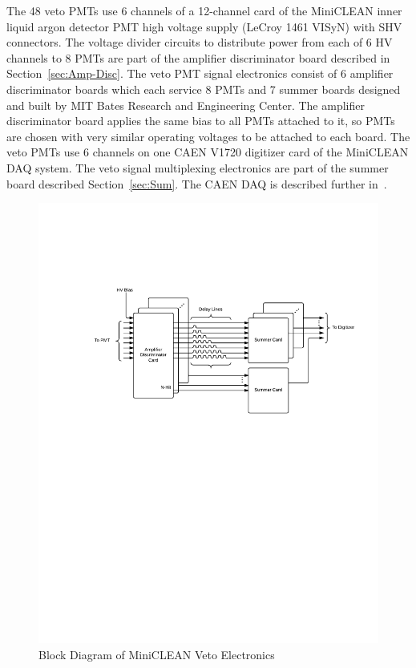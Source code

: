 \documentclass[pdftex]{JINST}
\begin{document}
The 48 veto PMTs use 6 channels of a 12-channel card of the
MiniCLEAN inner liquid argon detector PMT high voltage supply (LeCroy 1461 VISyN)
with SHV connectors. The voltage divider circuits to distribute power
from each of 6 HV channels to 8 PMTs are part of the amplifier
discriminator board described in Section~\ref{sec:Amp-Disc}. The veto
PMT signal electronics consist of 6 amplifier discriminator boards which each service
8 PMTs and 7 summer boards designed and built by MIT Bates Research and Engineering Center.
The amplifier discriminator board applies the same bias to all PMTs attached to it, so PMTs
are chosen with very similar operating voltages to be attached to each board.
The veto PMTs use 6 channels on one CAEN V1720 digitizer
card of the MiniCLEAN DAQ system. The veto signal multiplexing
electronics are part of the summer board described
Section~\ref{sec:Sum}. The CAEN DAQ is described further
in~\cite{ref:gastler_thesis}.

\begin{figure}[ht]
\begin{center}
\includegraphics[width=5in, keepaspectratio=true, trim=1.25in 5.75in 0.5in 2in, clip=true]{graphics/block.pdf}
\caption{Block Diagram of MiniCLEAN Veto Electronics
\label{fig:block_diagram}}
\end{center}
\end{figure}
\end{document}
